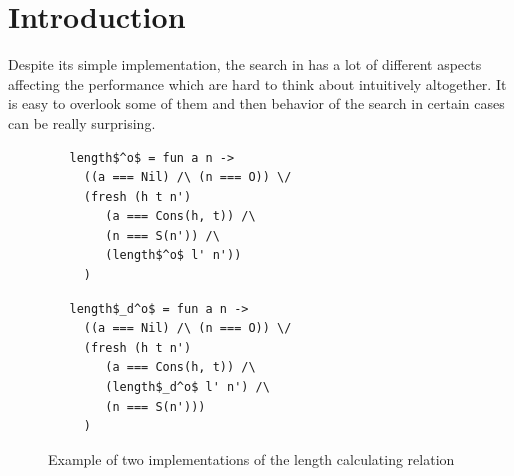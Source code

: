 \section{Introduction}

Despite its simple implementation, the search in \mK has a lot of different aspects affecting the performance which are hard to think about intuitively altogether. It is easy to overlook some of them and then behavior of the search in certain cases can be really surprising.

\begin{figure}[t]
\begin{lstlisting}
   length$^o$ = fun a n ->
     ((a === Nil) /\ (n === O)) \/
     (fresh (h t n')
        (a === Cons(h, t)) /\
        (n === S(n')) /\
        (length$^o$ l' n'))
     )
\end{lstlisting}

\begin{lstlisting}
   length$_d^o$ = fun a n ->
     ((a === Nil) /\ (n === O)) \/
     (fresh (h t n')
        (a === Cons(h, t)) /\
        (length$_d^o$ l' n') /\
        (n === S(n')))
     )
\end{lstlisting}

\caption{Example of two implementations of the length calculating relation}
\label{fig:length_implementations}
\end{figure}

